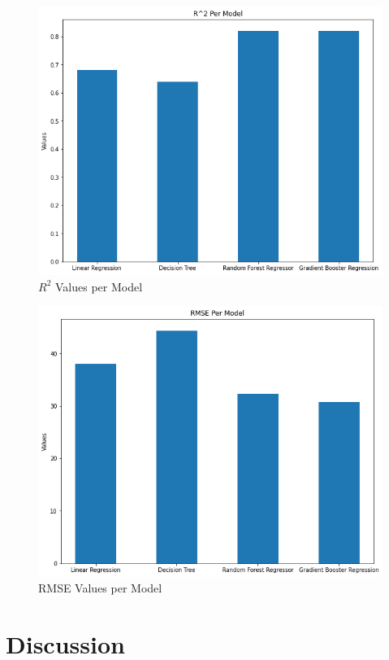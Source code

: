 \documentclass{article}
\begin{document}
\begin{figure}[h]
    \centering
    \includegraphics[width=\textwidth]{R2Values.png}
    \caption{\(R^2\) Values per Model}
    \label{figure:2}
\end{figure}

\begin{figure}[h]
    \centering
    \includegraphics[width=\textwidth]{RMSEValues.png}
    \caption{RMSE Values per Model}
    \label{figure:3}
\end{figure}

\section{Discussion}
\end{document}
